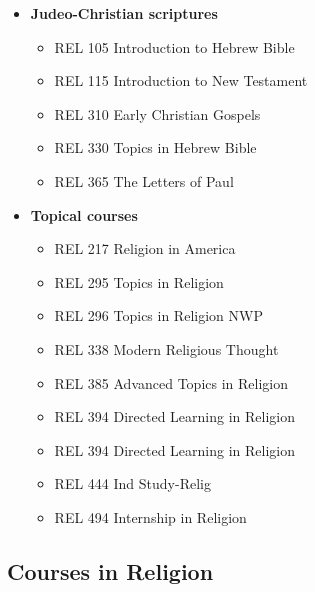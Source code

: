 \documentclass[
  letterpaper,
]{scrbook}
\providecommand{\tightlist}{%
  \setlength{\itemsep}{0pt}\setlength{\parskip}{0pt}}
\begin{document}
\begin{itemize}
\tightlist
\item
  \textbf{Judeo-Christian scriptures}

  \begin{itemize}
  \tightlist
  \item
    REL 105 Introduction to Hebrew Bible
  \item
    REL 115 Introduction to New Testament
  \item
    REL 310 Early Christian Gospels
  \item
    REL 330 Topics in Hebrew Bible
  \item
    REL 365 The Letters of Paul
  \end{itemize}
\item
  \textbf{Topical courses}

  \begin{itemize}
  \tightlist
  \item
    REL 217 Religion in America
  \item
    REL 295 Topics in Religion
  \item
    REL 296 Topics in Religion NWP
  \item
    REL 338 Modern Religious Thought
  \item
    REL 385 Advanced Topics in Religion
  \item
    REL 394 Directed Learning in Religion
  \item
    REL 394 Directed Learning in Religion
  \item
    REL 444 Ind Study-Relig
  \item
    REL 494 Internship in Religion
  \end{itemize}
\end{itemize}

\subsection{Courses in Religion}\label{courses-in-religion}
\end{document}
